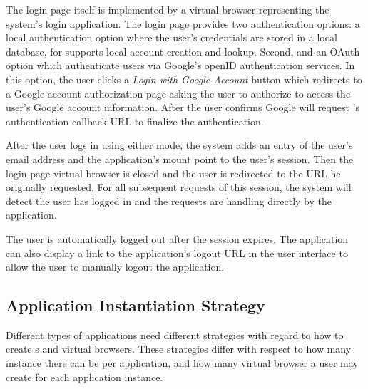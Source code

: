 The login page itself is implemented by a virtual
browser representing the system's login application. The login page provides two
authentication options: a local authentication option where the user's
credentials are stored in a local database, for \cb supports local account creation and lookup.
Second, and an OAuth~\cite{hardt2012oauth} option which
authenticate users via Google's openID authentication services. 
In this option, the user clicks a \emph{Login with Google Account} button which redirects
to a Google account authorization page asking the user to authorize \cb{} to access
the user's Google account information.
After the user confirms Google will request \cb{}'s authentication
callback URL to finalize the authentication.

After the user logs in using either mode, the system adds an entry of the
user's email address and the application's mount point to the user's session.
Then the login page virtual browser is closed and the user is
redirected to the URL he originally requested. 
For all subsequent requests of this session, the system will detect the user has 
logged in and the requests are handling directly by the application.

The user is automatically logged out after the session expires.
The application can also display a link to the application's logout URL 
in the user interface to allow the user to manually logout the application.

\subsection{Application Instantiation Strategy}
\label{sec:appinstantiation}

Different types of applications need different strategies with regard to how to 
create \appins{}s and virtual browsers.
These strategies differ with respect to how many instance there can be
per application, and how many virtual browser a user may create for each
application instance.



